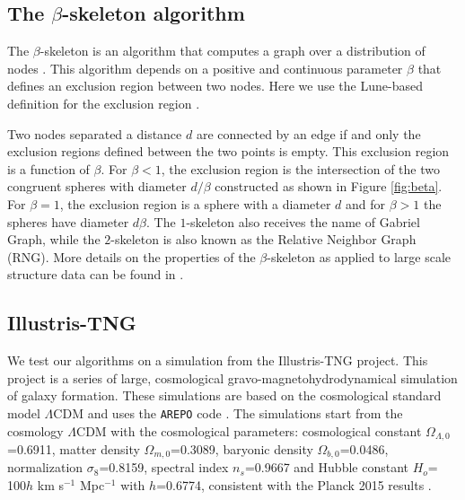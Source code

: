 \documentclass[usenatbib]{mnras}
\begin{document}
\subsection{The $\beta$-skeleton algorithm}


The $\beta$-skeleton is an algorithm that computes a graph over a
distribution of nodes .  
This algorithm depends on a positive and continuous parameter $\beta$
that defines an exclusion region between two nodes.
Here we use the Lune-based definition for the exclusion region \citep{Kirkpatrick1985}.

Two nodes separated a distance $d$ are connected by an edge if and only the exclusion regions defined between the two points is empty.
This exclusion region is a function of $\beta$.
For $\beta<1$, the exclusion region is the intersection of the two  
congruent spheres with diameter $d/\beta$ constructed as shown in Figure \ref{fig:beta}.
For  $\beta=1$, the exclusion region is a sphere with a diameter $d$ and for $\beta>1$ the spheres have diameter $d\beta$.
The $1$-skeleton also receives the name of Gabriel Graph, while the
 $2$-skeleton is also known as the Relative Neighbor Graph (RNG).
More details on the properties of the $\beta$-skeleton as applied to large scale structure data can be found in \cite{Fang2019}.

\subsection{Illustris-TNG}

We test our algorithms on a simulation from the Illustris-TNG project.
This project \citep{Nelson2019} is a series of large,
cosmological gravo-magnetohydrodynamical simulation of galaxy formation. 
These simulations are based on the cosmological standard model
$\Lambda$CDM and uses the \texttt{AREPO} code \citep{Springel2011}.
The simulations start from the cosmology $\Lambda$CDM with the
cosmological parameters: cosmological constant
$\Omega_{\Lambda,0}$=0.6911, matter density $\Omega_{m,0}$=0.3089,
baryonic density $\Omega_{b,0}$=0.0486, normalization
$\sigma_8$=0.8159, spectral index $n_s$=0.9667 and Hubble constant
$H_o$= 100$h$ km s$^{-1}$ Mpc$^{-1}$ with $h$=0.6774, consistent with
the Planck 2015 results \citep{Ade2016}.  
\end{document}
